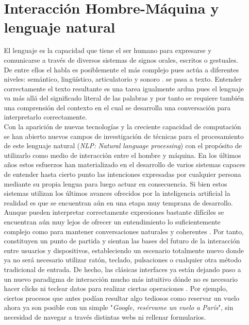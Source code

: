 \section{Interacción Hombre-Máquina y lenguaje natural}
El lenguaje es la capacidad que tiene el ser humano para expresarse y comunicarse a través de diversos sistemas de signos orales, escritos o gestuales. De entre ellos el habla es posiblemente el más complejo pues actúa a diferentes niveles: semántico, lingüístico, articulatorio y sonoro \cite{designTechniques}. se pasa a texto. Entender correctamente el texto resultante es una tarea igualmente ardua pues el lenguaje va más allá del significado literal de las palabras y por tanto se requiere también una comprensión del contexto en el cual se desarrolla una conversación para interpretarlo correctamente.\\

Con la aparición de nuevas tecnologías y la creciente capacidad de computación se han abierto nuevos campos de investigación de técnicas para el procesamiento de este lenguaje natural (\textit{NLP: Natural language processing}) con el propósito de utilizarlo como medio de interacción entre el hombre y máquina. En los últimos años estos esfuerzos han materializado en el desarrollo de varios sistemas capaces de entender hasta cierto punto las intenciones expresadas por cualquier persona mediante su propia lengua para luego actuar en consecuencia. Si bien estos sistemas utilizan los últimos avances ofrecidos por la inteligencia artificial la realidad es que se encuentran aún en una etapa muy temprana de desarrollo. Aunque pueden interpretar correctamente expresiones bastante difíciles se encuentran aún muy lejos de ofrecer un entendimiento lo suficientemente complejo como para mantener conversaciones naturales y coherentes \cite{designTechniques}. Por tanto, constituyen un punto de partida y sientan las bases del futuro de la interacción entre usuarios y dispositivos, estableciendo un escenario totalmente nuevo donde ya no será necesario utilizar ratón, teclado, pulsaciones o cualquier otra método tradicional de entrada. De hecho, las clásicas interfaces ya están dejando paso a un nuevo paradigma de interacción mucho más intuitivo dónde no es necesario hacer clicks ni teclear datos para realizar ciertas operaciones \cite{conversationSystems}. Por ejemplo, ciertos procesos que antes podían resultar algo tediosos como reservar un vuelo ahora ya son posible con un simple "\textit{Google, resérvame un vuelo a París}", sin necesidad de navegar a través distintas webs ni rellenar formularios.\\

